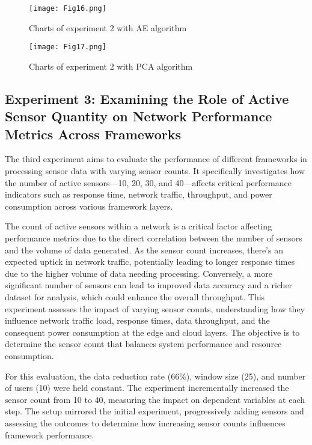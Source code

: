 \documentclass[11pt]{article}
\begin{document}
	\begin{figure}[h]
		\centering
		\texttt{[image: Fig16.png]}
		\caption{Charts of experiment 2 with AE algorithm}
	\end{figure}
	
	\begin{figure}[h]
		\centering
		\texttt{[image: Fig17.png]}
		\caption{Charts of experiment 2 with PCA algorithm}
	\end{figure}
	
	\subsection{\textbf{Experiment 3:} Examining the Role of Active Sensor Quantity on Network Performance Metrics Across Frameworks}
	The third experiment aims to evaluate the performance of different frameworks in
	processing sensor data with varying sensor counts. It specifically investigates how
	the number of active sensors—10, 20, 30, and 40—affects critical performance indicators such as response time, network traffic, throughput, and power consumption
	across various framework layers.
	
	The count of active sensors within a network is a critical factor affecting performance metrics due to the direct correlation between the number of sensors and the
	volume of data generated. As the sensor count increases, there’s an expected uptick
	in network traffic, potentially leading to longer response times due to the higher volume of data needing processing. Conversely, a more significant number of sensors
	can lead to improved data accuracy and a richer dataset for analysis, which could
	enhance the overall throughput. This experiment assesses the impact of varying sensor counts, understanding how they influence network traffic load, response times,
	data throughput, and the consequent power consumption at the edge and cloud layers. The objective is to determine the sensor count that balances system performance
	and resource consumption.
	
	For this evaluation, the data reduction rate (66\%), window size (25), and number
	of users (10) were held constant. The experiment incrementally increased the sensor count from 10 to 40, measuring the impact on dependent variables at each step.
	The setup mirrored the initial experiment, progressively adding sensors and assessing the outcomes to determine how increasing sensor counts influences framework
	performance.
	
\end{document}
